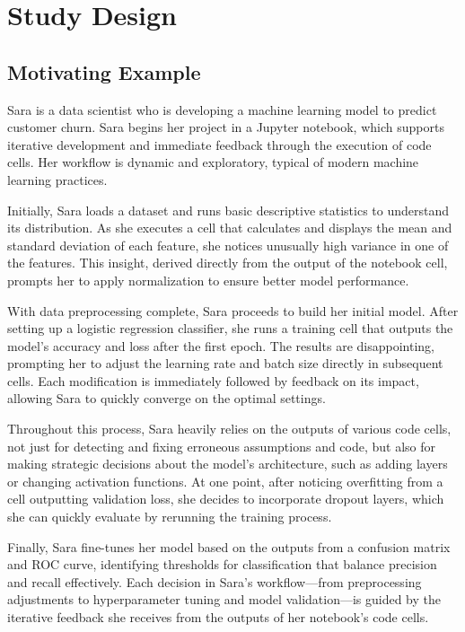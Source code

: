 \section{Study Design}

\subsection{Motivating Example}

Sara is a data scientist who is developing a machine learning model to predict customer churn. Sara begins her project in a Jupyter notebook, which supports iterative development and immediate feedback through the execution of code cells. Her workflow is dynamic and exploratory, typical of modern machine learning practices.

Initially, Sara loads a dataset and runs basic descriptive statistics to understand its distribution. As she executes a cell that calculates and displays the mean and standard deviation of each feature, she notices unusually high variance in one of the features. This insight, derived directly from the output of the notebook cell, prompts her to apply normalization to ensure better model performance.

With data preprocessing complete, Sara proceeds to build her initial model. After setting up a logistic regression classifier, she runs a training cell that outputs the model's accuracy and loss after the first epoch. The results are disappointing, prompting her to adjust the learning rate and batch size directly in subsequent cells. Each modification is immediately followed by feedback on its impact, allowing Sara to quickly converge on the optimal settings.

Throughout this process, Sara heavily relies on the outputs of various code cells, not just for detecting and fixing erroneous assumptions and code, but also for making strategic decisions about the model's architecture, such as adding layers or changing activation functions. At one point, after noticing overfitting from a cell outputting validation loss, she decides to incorporate dropout layers, which she can quickly evaluate by rerunning the training process.

Finally, Sara fine-tunes her model based on the outputs from a confusion matrix and ROC curve, identifying thresholds for classification that balance precision and recall effectively. Each decision in Sara's workflow—from preprocessing adjustments to hyperparameter tuning and model validation—is guided by the iterative feedback she receives from the outputs of her notebook's code cells.

